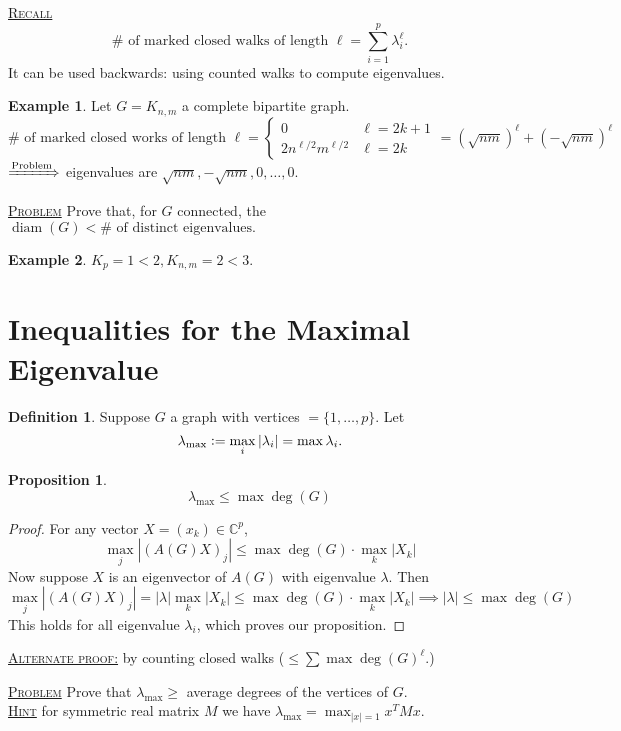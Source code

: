 \documentclass{report}
\newcommand{\C}{\mathbb{C}}
\def \diam {\operatorname{diam}}
\newcommand{\defeq}{\vcentcolon=}
\newcommand{\fancyem}[1]{\underline{\textsc{#1}}}
\newtheorem{proposition}{Proposition}[section]
\theoremstyle{definition}
\newtheorem{definition}{Definition}[section]
\newtheorem{example}{Example}[section]
\theoremstyle{remark}
\numberwithin{equation}{section}
\begin{document}
\fancyem{Recall}
\[\# \text{ of marked closed walks of length } \ell = \sum_{i=1}^p \lambda_i^\ell.\]
It can be used backwards: using counted walks to compute eigenvalues.

\begin{example}
Let $G = K_{n, m}$ a complete bipartite graph. 
\[\# \text{ of marked closed works of length } \ell = \begin{cases}
0 & \ell = 2k + 1 \\
2n^{\ell/2}m^{\ell/2} & \ell = 2k
\end{cases} = (\sqrt{nm})^\ell + (-\sqrt{nm})^{\ell}
\]
$\xRightarrow[]{\text{Problem}}$ eigenvalues are $\sqrt{nm}, -\sqrt{nm}, 0, \ldots, 0.$
\end{example}

\fancyem{Problem} Prove that, for $G$ connected, the $\diam(G) < \# \text{ of distinct eigenvalues}.$

\begin{example}
$K_p = 1 < 2, K_{n, m} = 2 < 3.$
\end{example}

\section{Inequalities for the Maximal Eigenvalue}
\begin{definition}
Suppose $G$ a graph with vertices $= \{1, \ldots, p\}.$ Let
\[\lambda_{\max} \defeq \max_i|\lambda_i| = \max \lambda_i.\]
\end{definition}

\begin{proposition}
\[\lambda_{\max} \leq \max \deg(G)\]
\end{proposition}
\begin{proof}
For any vector $X = (x_k) \in \C^p$,
\[
\max_j|(A(G)X)_j| \leq \max \deg(G) \cdot \max_k|X_k|
\]
Now suppose $X$ is an eigenvector of $A(G)$ with eigenvalue $\lambda$. Then
\[
\max_j|(A(G)X)_j| = |\lambda| \max_k|X_k| \leq \max \deg(G) \cdot \max_k|X_k| \implies |\lambda| \leq \max \deg(G)
\]
This holds for all eigenvalue $\lambda_i$, which proves our proposition.
\end{proof}
\fancyem{Alternate proof:} by counting closed walks ($\leq \sum \max\deg(G)^\ell$.)

\fancyem{Problem} Prove that $\lambda_{\max} \geq $ average degrees of the vertices of $G$.\\
\fancyem{Hint} for symmetric real matrix $M$ we have $\lambda_{\max} = \max_{|x| = 1} x^{T}Mx.$
\end{document}
